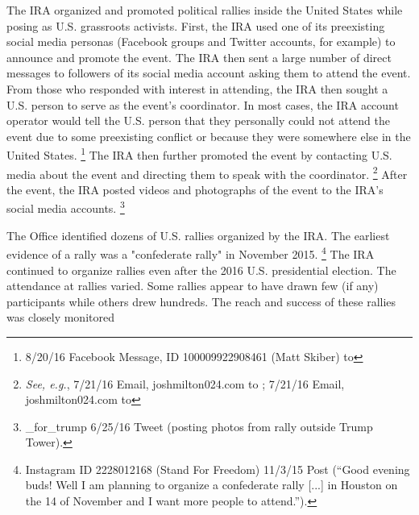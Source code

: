 The IRA organized and promoted political rallies inside the United States while posing as U.S. grassroots activists.
First, the IRA used one of its preexisting social media personas (Facebook groups and Twitter accounts, for example) to announce and promote the event.
The IRA then sent a large number of direct messages to followers of its social media account asking them to attend the event.
From those who responded with interest in attending, the IRA then sought a U.S. person to serve as the event's coordinator.
In most cases, the IRA account operator would tell the U.S. person that they personally could not attend the event due to some preexisting conflict or because they were somewhere else in the United States.%
\footnote{8/20/16 Facebook Message, ID 100009922908461 (Matt Skiber) to }
The IRA then further promoted the event by contacting U.S. media about the event and directing them to speak with the coordinator.%
\footnote{\textit{See, e.g.}, 7/21/16 Email, joshmilton024\@gmail.com to ;
7/21/16 Email, joshmilton024\@gmail.com to }
After the event, the IRA posted videos and photographs of the event to the IRA's  social media accounts.%
\footnote{\@march\_for\_trump 6/25/16 Tweet (posting photos from rally outside Trump Tower).}

The Office identified dozens of U.S. rallies organized by the IRA\null. The earliest evidence of a rally was a "confederate rally" in November 2015.%
\footnote{Instagram ID 2228012168 (Stand For Freedom) 11/3/15 Post (“Good evening buds!
Well I am planning to organize a confederate rally [...] in Houston on the 14 of November and I want more people to attend.”).}
The IRA continued to organize rallies even after the 2016 U.S. presidential election.
The attendance at rallies varied.
Some rallies appear to have drawn few (if any) participants while others drew hundreds.
The reach and success of these rallies was closely monitored 

